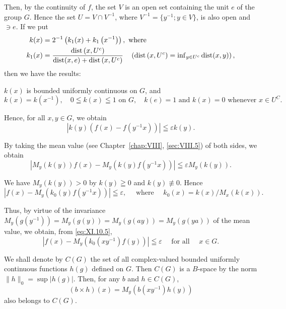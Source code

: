 Then, by the continuity of $f$, the set $V$ is an open set containing the unit $e$ of the group $G$. Hence the set $U = V \cap V^{-1}$, where $V^{-1} = \{y^{-1}; y \in V\}$, is also open and $\ni e$. If we put 
\begin{align}
k (x)& = 2 ^{-1} \left(k _{1} (x) + k _{1} \left(x ^{-1}\right)\right), \text{ where } \notag \\
k _{1} (x)& = \frac {\operatorname{dist} \left(x , U ^{c}\right)}{\operatorname{dist} (x , e) + \operatorname{dist} \left(x , U ^{c}\right)} \quad \left(\operatorname{dist} \left(x, U ^{c}\right) = \inf\nolimits _ {y \in U ^{c}} \operatorname{dist} (x, y)\right), \label{eq:XI.10.3}
\end{align}
then we have the results: 

$k(x)$ is bounded uniformly continuous on $G$, and 
\begin{equation}k (x) = k \left(x ^{-1}\right), \quad 0 \leqq k (x) \leqq 1 \text{ on } G, \quad k (e) = 1 \text{ and } k (x) = 0 \text{ whenever } x \in U ^{C}. \label{eq:XI.10.4}\end{equation}

Hence, for all $x, y \in G$, we obtain 
\[
\left| k (y) \left(f (x) - f \left(y ^{-1} x\right)\right) \right| \leqq \varepsilon k (y).
\]

By taking the mean value (see Chapter~\ref{chap:VIII}, \ref{sec:VIII.5}) of both sides, we obtain 
\[
\left| M _{y} (k (y)) f (x) - M _{y} (k (y) f \left(y ^{-1} x\right)) \right| \leqq \varepsilon M _{y} (k (y)).
\]

We have $M_y(k(y)) > 0$ by $k(y) \geqq 0$ and $k(y) \not\equiv 0$. Hence 
\begin{equation}\label{eq:XI.10.5}
\left| f (x) - M _{y} \left(k _{0} (y) f \left(y ^{-1} x\right)\right) \right| \leqq \varepsilon , \quad \text{ where } \quad k _{0} (x) = k (x) / M _{x} (k (x)).
\end{equation}

Thus, by virtue of the invariance $M_y(g(y^{-1})) = M_y(g(y)) = M_y(g(ay)) = M_y(g(ya))$ of the mean value, we obtain, from \eqref{eq:XI.10.5}, 
\begin{equation}\label{eq:XI.10.6}
\left| f (x) - M _{y} \left(k _{0} \left(x y ^{-1}\right) f (y)\right) \right| \leqq \varepsilon \quad \text{ for all } \quad x \in G.
\end{equation}

\begin{proposition}\label{prop:XI.10.Proposition.1} We shall denote by $C(G)$ the set of all complex-valued bounded uniformly continuous functions $h(g)$ defined on $G$. Then $C(G)$ is a $B$-space by the norm $\|h\|_0 = \sup |h(g)|$. Then, for any $b$ and $h \in C(G)$, 
\begin{equation}\label{eq:XI.10.7}
(b \times h) (x) = M _{y} (b (x y ^{-1}) h (y))
\end{equation}
also belongs to $C(G)$. 
\end{proposition}

